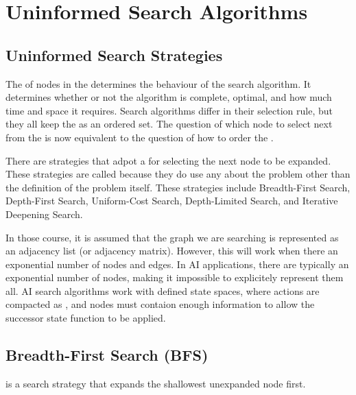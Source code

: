 \section{Uninformed Search Algorithms}

\subsection{Uninformed Search Strategies}

The  of nodes in the \Frontier determines the behaviour of the search algorithm. It determines whether or not the algorithm is complete, optimal, and how much time and space it requires. Search algorithms differ in their selection rule, but they all keep the \Frontier as an ordered set. The question of which node to select next from the \Frontier is now equivalent to the question of how to order the \Frontier.

There are strategies that adpot a  for selecting the next node to be expanded. These strategies are called  because they do  use any  about the problem other than the definition of the problem itself. These strategies include Breadth-First Search, Depth-First Search, Uniform-Cost Search, Depth-Limited Search, and Iterative Deepening Search. 

In those course, it is assumed that the graph we are searching is  represented as an adjacency list (or adjacency matrix). However, this will  work when there an exponential number of nodes and edges. In AI applications, there are typically an exponential number of nodes, making it impossible to explicitely represent them all. AI search algorithms work with  defined state spaces, where actions are compacted as , and nodes must contaion enough information to allow the successor state function to be applied.

\subsection{Breadth-First Search (BFS)}

\begin{definition}\label{def:bfs}
     is a search strategy that expands the shallowest unexpanded node first.
\end{definition}

